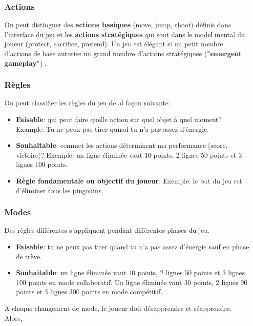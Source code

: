 \subsubsection{Actions}

On peut distinguer des \textbf{actions basiques} (move, jump, shoot) d\'efinis dans l'interface du jeu et les \textbf{actions strat\'egiques} qui sont dans le model mental du joueur (protect, sacrifice, pretend). Un jeu est \'el\'egant si un petit nombre d'actions de base autorise un grand nombre d'actions strat\'egiques (\textbf{"emergent gameplay"}) .

\subsubsection{R\`egles}

On peut classifier les r\`egles du jeu de al fa\c{c}on suivante:

\begin{itemize}
\item \textbf{Faisable}: qui peut faire quelle action sur quel objet \`a quel moment? Example: Tu ne peux pas tirer qunad tu n'a pas assez d'\'energie.
\item \textbf{Souhaitable}: commet les actions d\'eterminent ma performance (score, victoire)? Exemple: un ligne \'elimin\'ee vaut 10 points, 2 lignes 50 points et 3 lignes 100 points.
\item \textbf{R\`egle fondamentale ou objectif du joueur}. Exemple: le but du jeu est d'\'eliminer tous les pingouins.
\end{itemize}

\subsubsection{Modes}

Des r\`egles diff\'erentes s'appliquent pendant diff\'erentes phases du jeu.

\begin{itemize}
\item \textbf{Faisable}: tu ne peux pas tirer quand tu n'a pas assez d'\'energie sauf en phase de tr\`eve.
\item \textbf{Souhaitable}: un ligne \'elimin\'ee vaut 10 points, 2 lignes 50 points et 3 lignes 100 points en mode collaboratif. Un ligne \'elimin\'ee vaut 30 points, 2 lignes 90 points et 3 lignes 300 points en mode comp\'etitif.
\end{itemize}

A chaque changement de mode, le joueur doit d\'esapprendre et r\'eapprendre. Alors,

